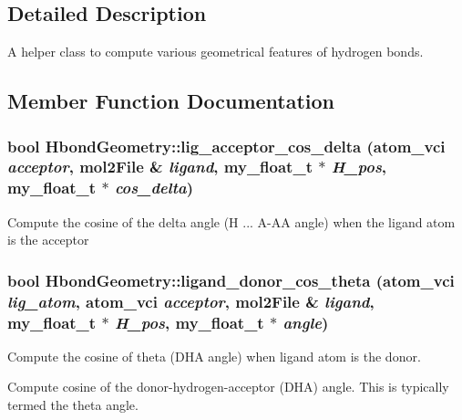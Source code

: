 \subsection{Detailed Description}
A helper class to compute various geometrical features of hydrogen bonds. 



\subsection{Member Function Documentation}
\subsubsection{\setlength{\rightskip}{0pt plus 5cm}bool Hbond\-Geometry::lig\_\-acceptor\_\-cos\_\-delta (atom\_\-vci {\em acceptor}, \bf{mol2File} \& {\em ligand}, my\_\-float\_\-t $\ast$ {\em H\_\-pos}, my\_\-float\_\-t $\ast$ {\em cos\_\-delta})}\label{classSimSite3D_1_1HbondGeometry_40d1f230f39f08f31cabf8cf239f744a}


Compute the cosine of the delta angle (H ... A-AA angle) when the ligand atom is the acceptor 
\subsubsection{\setlength{\rightskip}{0pt plus 5cm}bool Hbond\-Geometry::ligand\_\-donor\_\-cos\_\-theta (atom\_\-vci {\em lig\_\-atom}, atom\_\-vci {\em acceptor}, \bf{mol2File} \& {\em ligand}, my\_\-float\_\-t $\ast$ {\em H\_\-pos}, my\_\-float\_\-t $\ast$ {\em angle})}\label{classSimSite3D_1_1HbondGeometry_e9bec32ecce4d5e5d3de550b97a56718}


Compute the cosine of theta (DHA angle) when ligand atom is the donor. 

Compute cosine of the donor-hydrogen-acceptor (DHA) angle. This is typically termed the theta angle. 
